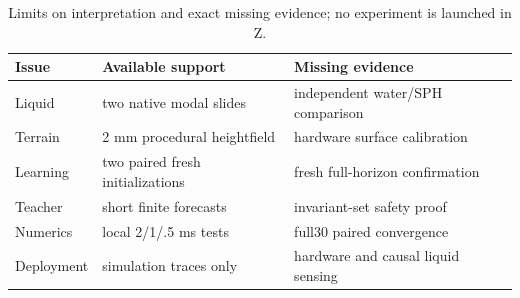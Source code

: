 \begin{table}[t]
\centering\small
\caption{Limits on interpretation and exact missing evidence; no experiment is launched in Z.}
\label{tab:limitations}
\begin{tabular}{lll}
\hline
Issue & Available support & Missing evidence \\
\hline
Liquid & two native modal slides & independent water/SPH comparison \\
Terrain & 2 mm procedural heightfield & hardware surface calibration \\
Learning & two paired fresh initializations & fresh full-horizon confirmation \\
Teacher & short finite forecasts & invariant-set safety proof \\
Numerics & local 2/1/.5 ms tests & full30 paired convergence \\
Deployment & simulation traces only & hardware and causal liquid sensing \\
\hline
\end{tabular}
\end{table}
